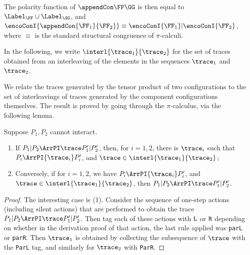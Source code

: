 \noindent
 The polarity function of $\appendCon \FF \GG$ 
 is then equal to $\Label_{\FF} \cup \Label_{\GG}$, and
$\encoConI {
\appendCon
{\FF_1} {\FF_2}}
\equiv 
\encoConI {
\FF_1}
|
\encoConI {
 {\FF_2}}$,  where $\equiv$ is the standard structural congruence of  $\pi$-calculi.
 

In the following, we write $\interl{\trace_1}{\trace_2}$ for the set of traces
obtained from an interleaving of the elements in the sequences $\trace_1$ and $\trace_2$.

We relate the traces generated by the tensor product 
of two configurations to the set of interleavings of traces generated 
by the component configurations themselves. 
The result is proved by going through the $\pi$-calculus,
via the following lemma.


\begin{lemma}
  \label{l:dec_pi}
  Suppose $P_1,P_2$ cannot interact.
  \begin{enumerate}
  \item
  If $P_1 | P_2 \ArrPI \trace   P_1'| P_2'$,
  then, for $i=1,2$,  there is  $ \trace_i $ 
  such that $P_i \ArrPI { \trace_i} P_i'$, and $ \trace  
  \in   \interl { \trace_1   }{ \trace_2 }$;
  \item 
  Conversely,
  if for  $i=1,2$,  we have $P_i \ArrPI { \trace_i} P_i'$, and $ \trace  
  \in   \interl { \trace_1   }{ \trace_2 }$, then 
  $P_1 | P_2 \ArrPI \trace   P_1'| P_2'$.
  \end{enumerate} 
\end{lemma} 


\begin{proof}
  The interesting case is (1). 
  Consider the sequence of one-step  actions (including silent actions) that 
  are performed to obtain the trace
  $P_1 | P_2 \ArrPI \trace   P_1'| P_2'$.  Then tag each of these actions with ${\tt L}$ or 
  ${\tt R}$ depending on whether in the derivation proof of that action, the last rule
  applied was {\tt parL} or  {\tt parR}.
  Then $ \trace_1$ is obtained by collecting the subsequence of $\trace$ with  
  the {\tt ParL} tag, and similarly for   $ \trace_2$ with
  {\tt ParR}.
\end{proof}

